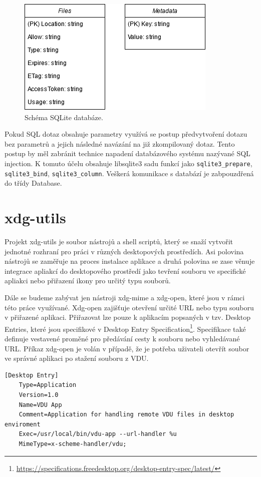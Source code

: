 \begin{figure}[h]
    \centering
    \includegraphics[width=0.52\linewidth]{other-fig/database.png}
    \caption{Schéma SQLite databáze.}
\end{figure}

Pokud SQL dotaz obsahuje parametry využívá se postup předvytvoření dotazu bez parametrů a jejich následné navázání na již zkompilovaný dotaz. Tento postup by měl zabránit
technice napadení databázového systému nazývané SQL injection. K tomuto účelu obsahuje libsqlite3 sadu funkcí jako \texttt{sqlite3\_prepare}, \texttt{sqlite3\_bind},
\texttt{sqlite3\_column}. Veškerá komunikace s databází je zabpouzdřená do třídy Database.

\section{xdg-utils}
Projekt xdg-utils je soubor nástrojů a shell scriptů, který se snaží vytvořit jednotné rozhraní pro práci v různých desktopových prostředích. Asi polovina nástrojů se 
zaměřuje na proces instalace aplikace a druhá polovina se zase věnuje integrace apliakcí do desktopového prostředí jako tevření souboru ve specifické apliakci nebo
přiřazení ikony pro určitý typu souborů.

Dále se budeme zabývat jen nástroji xdg-mime a xdg-open, které jsou v rámci této práce využívané. Xdg-open zajišťuje otevření určité URL nebo typu souboru v přiřazené aplikaci.
Přiřazovat lze pouze k aplikacím popsaných v tzv. Desktop Entries, které jsou specifikové v Desktop Entry Specification\footnote{\url{https://specifications.freedesktop.org/desktop-entry-spec/latest/}}.
Specifikace také definuje vestavené proměné pro předávání cesty k souboru nebo vyhledávané URL. Příkaz xdg-open je volán v případě, že je potřeba uživateli otevřít soubor ve
správné aplikaci po stažení souboru z VDU.

\begin{lstlisting}[caption={Příklad struktury Desktop Entry souboru}]
    [Desktop Entry]
    Type=Application
    Version=1.0
    Name=VDU App
    Comment=Application for handling remote VDU files in desktop enviroment
    Exec=/usr/local/bin/vdu-app --url-handler %u
    MimeType=x-scheme-handler/vdu;    
\end{lstlisting}


